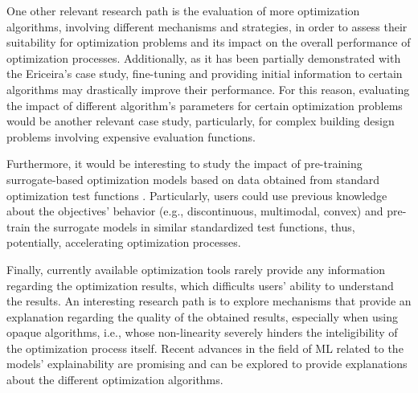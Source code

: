 One other relevant research path is the evaluation of more optimization algorithms, involving different mechanisms and strategies, in order to assess their suitability for optimization problems and its impact on the overall performance of optimization processes. Additionally, as it has been partially demonstrated with the Ericeira's case study, fine-tuning and providing initial information to certain algorithms may drastically improve their performance. For this reason, evaluating the impact of different algorithm's parameters for certain optimization problems would be another relevant case study, particularly, for complex building design problems involving expensive evaluation functions. 

Furthermore, it would be interesting to study the impact of pre-training surrogate-based optimization models based on data obtained from standard optimization test functions . Particularly, users could use previous knowledge about the objectives' behavior (e.g., discontinuous, multimodal, convex) and pre-train the surrogate models in similar standardized test functions, thus, potentially, accelerating optimization processes. %


Finally, currently available optimization tools rarely provide any information regarding the optimization results, which difficults users' ability to understand the results. An interesting research path is to explore mechanisms that provide an explanation regarding the quality of the obtained results, especially when using opaque algorithms, i.e., whose non-linearity severely hinders the inteligibility of the optimization process itself. Recent advances in the field of \ac{ML} related to the models' explainability are promising and can be explored to provide explanations about the different optimization algorithms. 
	
	
	
	
	